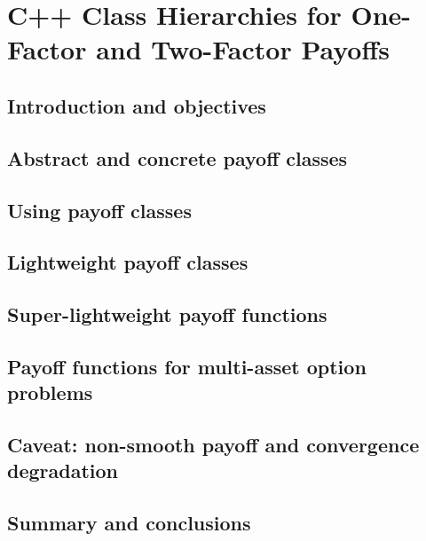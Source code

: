 \chapter{C++ Class Hierarchies for One-Factor and Two-Factor Payoffs}

\section{Introduction and objectives}

\section{Abstract and concrete payoff classes}

\section{Using payoff classes}

\section{Lightweight payoff classes}

\section{Super-lightweight payoff functions}

\section{Payoff functions for multi-asset option problems}

\section{Caveat: non-smooth payoff and convergence degradation}

\section{Summary and conclusions}